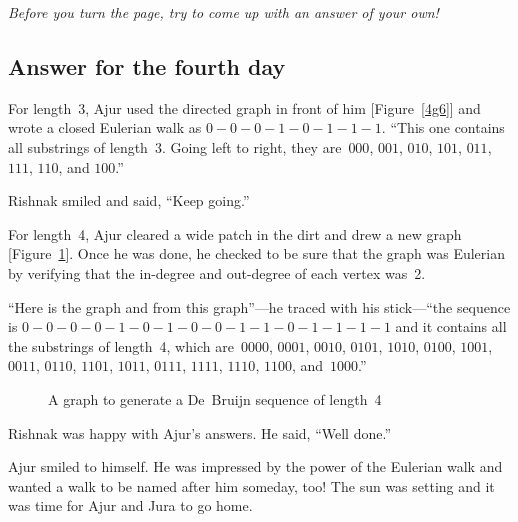 \textit{Before you turn the page, try to come up with an answer of your own!}

\newpage
\subsection*{Answer for the fourth day}
For length~3, Ajur used the directed graph in front of him [Figure~\ref{4g6}] and wrote a closed Eulerian walk as $0-0-0-1-0-1-1-1$. ``This one contains all substrings of length~3. Going left to right, they are~$000$, $001$, $010$, $101$, $011$, $111$, $110$, and $100$.''

Rishnak smiled and said, ``Keep going.''

For length~4, Ajur cleared a wide patch in the dirt and drew a new graph [Figure~\ref{4a1}]. Once he was done, he checked to be sure that the graph was Eulerian by verifying that the in-degree and out-degree of each vertex was~2.

``Here is the graph and from this graph''---he traced with his stick---``the sequence is $0-0-0-0-1-0-1-0-0-1-1-0-1-1-1-1$ and it contains all the substrings of length~4, which are~$0000$, $0001$, $0010$, $0101$, $1010$, $0100$, $1001$, $0011$, $0110$, $1101$, $1011$, $0111$, $1111$, $1110$, $1100$, and~$1000$.''

\begin{figure}
\begin{center}
\caption{A graph to generate a De~Bruijn sequence of length~4}\label{4a1}
\end{center}
\end{figure}

Rishnak was happy with Ajur's answers. He said, ``Well done.''

Ajur smiled to himself. He was impressed by the power of the Eulerian walk and wanted a walk to be named after him someday, too! The sun was setting and it was time for Ajur and Jura to go home.
